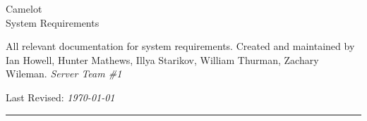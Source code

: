 \begin{titlepage}

\noindent
\titlefont Camelot \\ System Requirements \par
\epigraph{All relevant documentation for system requirements. Created and maintained by Ian Howell, Hunter Mathews, Illya Starikov, William Thurman, Zachary Wileman. \textit{Server Team \#1}}%
{Last Revised: \textit{\today}\\\textsc{\lastEditAuthor}}
\null\vfill
\vspace*{1cm}
\noindent
\hfill
\begin{minipage}{0.35\linewidth}
    \begin{flushright}
        \printauthor
    \end{flushright}
\end{minipage}
%
\begin{minipage}{0.02\linewidth}
    \rule{1pt}{125pt}
\end{minipage}
\titlepagedecoration
\end{titlepage}
